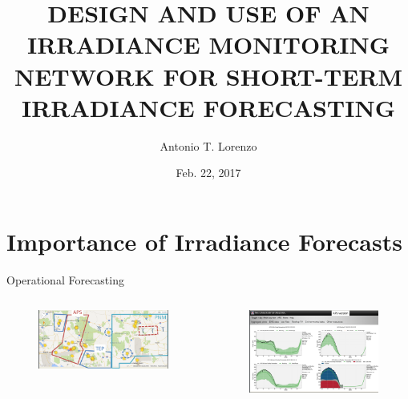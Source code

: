 \documentclass[aspectratio=169]{beamer}
\title[Dissertation Proposal]{DESIGN AND USE OF AN IRRADIANCE
  MONITORING NETWORK FOR SHORT-TERM IRRADIANCE FORECASTING}
\author[Lorenzo]{Antonio T. Lorenzo}
\institute{University of Arizona}
\date{Feb. 22, 2017}
\begin{document}
\begin{frame}
  \titlepage
\end{frame}


\section{Importance of Irradiance Forecasts}
\label{sec:intro}

\begin{frame}{Operational Forecasting}
\begin{columns}
\begin{column}{0.55\textwidth}
\begin{figure}[h]
\includegraphics[width=\textwidth]{figs/utilities.png}
\end{figure}
\end{column}
\begin{column}{0.4\textwidth}
\begin{figure}[h]
\centering
\includegraphics[width=\textwidth]{figs/website.png}
\end{figure}
\end{column}
\end{columns}
\end{frame}
\end{document}
